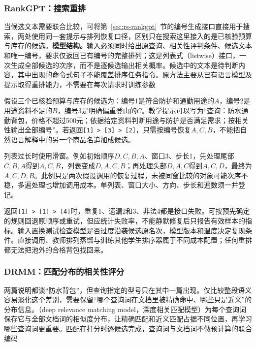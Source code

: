 \Needspace{100mm}
\subsubsection{RankGPT：搜索重排}
\label{sec:rs-search-rankgpt}

当候选文本需要联合比较，可将第~\ref{sec:rs-rankgpt}~节的编号生成接口直接用于搜索，两处使用同一套提示与排列恢复口径，区别只在搜索这里接入的是已核验预算与库存的候选。\textbf{模型结构。}输入必须同时给出原查询、相关性评判条件、候选文本和唯一编号，要求仅返回已有编号的完整排列；这是列表式（listwise）接口，一次生成全部候选的次序，而不是逐候选输出相关概率。候选中的文本是待判断内容，其中出现的命令式句子不能覆盖排序任务指令。原方法主要从已有语言模型及提示取得重排能力，不需要在每次请求时训练参数

假设三个已核验预算与库存的候选为：编号1是符合防护和通勤用途的$A$，编号2是用途资料不足的$B$，编号3是明确偏重登山的$C$。教学提示可以写为“查询：防水通勤背包，价格不超过500元；依据给定资料判断用途与防护是否满足需求；按相关性输出全部编号”。若返回\texttt{[1] > [3] > [2]}，只需按编号恢复$A,C,B$，不能把自然语言解释中的另一个商品名追加成候选。

列表过长时使用滑窗。例如初始顺序$D,C,B,A$、窗口3、步长1，先处理尾部$C,B,A$得到$A,C,B$，列表变成$D,A,C,B$；再处理头部$D,A,C$得到$A,C,D$，最终为$A,C,D,B$。此例只是两次假设调用的恢复过程，未被同窗比较的对象可能次序不稳，多遍处理也增加调用成本。单列表、窗口大小、方向、步长和遍数须一并登记。

返回\texttt{[1] > [1] > [4]}时，重复1、遗漏2和3、非法4都是接口失败。可按预先确定的规则回退原顺序或重试，但应统计失败率，不能静默修复后只报告有效样本的指标。输入置换测试检查模型是否过度沿袭候选原名次，模型版本和温度决定复现条件。直接调用、教师排列蒸馏与训练其他学生排序器属于不同成本配置；任何重排都无法把池外的合格背包找回来。

\Needspace{100mm}
\subsubsection{DRMM：匹配分布的相关性评分}
\label{sec:rs-search-drmm}

两篇说明都谈“防水背包”，但查询指定的型号只在其中一篇出现。仅比较整段语义容易淡化这个差别，需要保留“哪个查询词在文档里被精确命中、哪些只是近义”的分布信息。（deep relevance matching model，深度相关匹配模型）为每个查询词保存它与全部文档词的相似度分布，让精确匹配和近义匹配占据不同位置，再学习哪些查询词更重要。匹配在打分时逐候选完成，查询词与文档词不做预计算的联合编码

